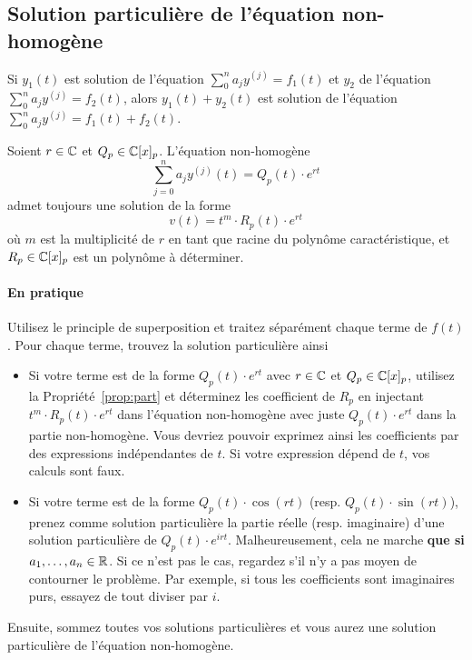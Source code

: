 \subsection{Solution particulière de l'équation non-homogène}
\begin{myprop}
	Si $y_1(t)$ est solution de l'équation $\sum_0^n a_j y^{(j)} = f_1(t)$ et $y_2$ de l'équation $\sum_0^n a_j y^{(j)} = f_2(t)$,
	alors $y_1(t) + y_2(t)$ est solution de l'équation $\sum_0^n a_j y^{(j)} = f_1(t) + f_2(t)$.
\end{myprop}

\begin{myprop}
	\label{prop:part}
	Soient $r \in \mathbb{C}$ et $Q_p \in \mathbb{C}[x]_p$.
	L'équation non-homogène
	\[ \sum_{j=0}^n a_j y^{(j)}(t) = Q_p(t) \cdot e^{rt} \]
	admet toujours une solution de la forme
	\[ v(t) = t^m \cdot R_p(t) \cdot e^{rt} \]
	où $m$ est la multiplicité de $r$ en tant que racine du polynôme caractéristique,
	et $R_p \in \mathbb{C}[x]_p$ est un polynôme à déterminer.
\end{myprop}

\paragraph{En pratique}
Utilisez le principle de superposition et traitez séparément chaque terme de $f(t)$.
Pour chaque terme, trouvez la solution particulière ainsi
\begin{itemize}
	\item Si votre terme est de la forme $Q_p(t) \cdot e^{rt}$ avec $r \in \mathbb{C}$ et $Q_p \in \mathbb{C}[x]_p$,
		utilisez la Propriété~\ref{prop:part} et déterminez les coefficient de $R_p$ en injectant
		$t^m \cdot R_p(t) \cdot e^{rt}$ dans l'équation non-homogène avec juste $Q_p(t) \cdot e^{rt}$
		dans la partie non-homogène.
		Vous devriez pouvoir exprimez ainsi les coefficients par des expressions indépendantes de $t$.
		Si votre expression dépend de $t$, vos calculs sont faux.
	\item Si votre terme est de la forme $Q_p(t) \cdot \cos(rt)$ (resp. $Q_p(t) \cdot \sin(rt)$),
		prenez comme solution particulière la partie réelle (resp. imaginaire) d'une solution particulière de
		$Q_p(t) \cdot e^{irt}$.
		Malheureusement, cela ne marche \textbf{que si $a_1, \dots, a_n \in \mathbb{R}$}.
		Si ce n'est pas le cas, regardez s'il n'y a pas moyen de contourner le problème.
		Par exemple, si tous les coefficients sont imaginaires purs, essayez de tout diviser par $i$.
\end{itemize}
Ensuite, sommez toutes vos solutions particulières et vous aurez une solution particulière de l'équation non-homogène.

